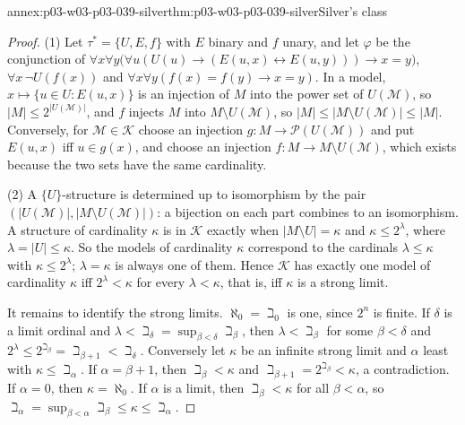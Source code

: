 \begin{annexitem}{annex:p03-w03-p03-039-silver}{thm:p03-w03-p03-039-silver}{Silver's class}
\begin{proof}
(1) Let \(\tau^*=\{U,E,f\}\) with \(E\) binary and \(f\) unary, and let
\(\varphi\) be the conjunction of
\(\forall x\forall y\bigl(\forall u(U(u)\to(E(u,x)\leftrightarrow E(u,y)))\to x=y\bigr)\),
\(\forall x\,\neg U(f(x))\) and \(\forall x\forall y(f(x)=f(y)\to x=y)\). In a
model, \(x\mapsto\{u\in U:E(u,x)\}\) is an injection of \(M\) into the power
set of \(U(\mathcal M)\), so \(\lvert M\rvert\le2^{\lvert U(\mathcal M)\rvert}\),
and \(f\) injects \(M\) into \(M\setminus U(\mathcal M)\), so
\(\lvert M\rvert\le\lvert M\setminus U(\mathcal M)\rvert\le\lvert M\rvert\).
Conversely, for \(\mathcal M\in\mathcal K\) choose an injection
\(g:M\to\mathcal P(U(\mathcal M))\) and put \(E(u,x)\) iff \(u\in g(x)\), and
choose an injection \(f:M\to M\setminus U(\mathcal M)\), which exists because
the two sets have the same cardinality.

(2) A \(\{U\}\)-structure is determined up to isomorphism by the pair
\((\lvert U(\mathcal M)\rvert,\lvert M\setminus U(\mathcal M)\rvert)\): a
bijection on each part combines to an isomorphism. A structure of
cardinality \(\kappa\) is in \(\mathcal K\) exactly when
\(\lvert M\setminus U\rvert=\kappa\) and \(\kappa\le2^{\lambda}\), where
\(\lambda=\lvert U\rvert\le\kappa\). So the models of cardinality \(\kappa\)
correspond to the cardinals \(\lambda\le\kappa\) with \(\kappa\le2^\lambda\);
\(\lambda=\kappa\) is always one of them. Hence \(\mathcal K\) has exactly one
model of cardinality \(\kappa\) iff \(2^\lambda<\kappa\) for every
\(\lambda<\kappa\), that is, iff \(\kappa\) is a strong limit.

It remains to identify the strong limits. \(\aleph_0=\beth_0\) is one, since
\(2^n\) is finite. If \(\delta\) is a limit ordinal and
\(\lambda<\beth_\delta=\sup_{\beta<\delta}\beth_\beta\), then
\(\lambda<\beth_\beta\) for some \(\beta<\delta\) and
\(2^\lambda\le2^{\beth_\beta}=\beth_{\beta+1}<\beth_\delta\). Conversely let
\(\kappa\) be an infinite strong limit and \(\alpha\) least with
\(\kappa\le\beth_\alpha\). If \(\alpha=\beta+1\), then \(\beth_\beta<\kappa\)
and \(\beth_{\beta+1}=2^{\beth_\beta}<\kappa\), a contradiction. If
\(\alpha=0\), then \(\kappa=\aleph_0\). If \(\alpha\) is a limit, then
\(\beth_\beta<\kappa\) for all \(\beta<\alpha\), so
\(\beth_\alpha=\sup_{\beta<\alpha}\beth_\beta\le\kappa\le\beth_\alpha\).
\end{proof}
\end{annexitem}

